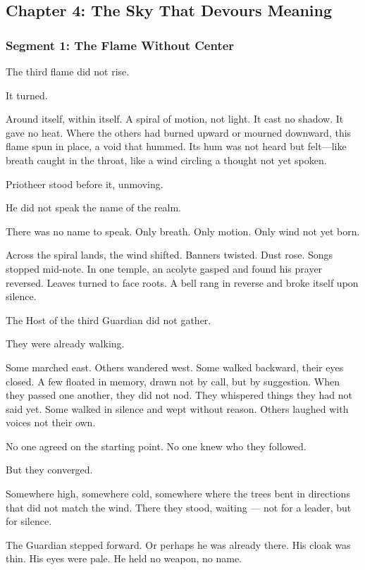\documentclass[9pt]{article}
\begin{document}
\newpage

\subsection*{Chapter 4: The Sky That Devours Meaning}

\vspace{1in}

\subsubsection*{Segment 1: The Flame Without Center}

The third flame did not rise.

It turned.

Around itself, within itself. A spiral of motion, not light. It cast no shadow. It gave no heat. Where the others had burned upward or mourned downward, this flame spun in place, a void that hummed. Its hum was not heard but felt—like breath caught in the throat, like a wind circling a thought not yet spoken.

Priotheer stood before it, unmoving.

He did not speak the name of the realm.

There was no name to speak. Only breath. Only motion. Only wind not yet born.

Across the spiral lands, the wind shifted. Banners twisted. Dust rose. Songs stopped mid-note. In one temple, an acolyte gasped and found his prayer reversed. Leaves turned to face roots. A bell rang in reverse and broke itself upon silence.

The Host of the third Guardian did not gather.

They were already walking.

Some marched east. Others wandered west. Some walked backward, their eyes closed. A few floated in memory, drawn not by call, but by suggestion. When they passed one another, they did not nod. They whispered things they had not said yet. Some walked in silence and wept without reason. Others laughed with voices not their own.

No one agreed on the starting point. No one knew who they followed.

But they converged.

Somewhere high, somewhere cold, somewhere where the trees bent in directions that did not match the wind. There they stood, waiting — not for a leader, but for silence.

The Guardian stepped forward. Or perhaps he was already there. His cloak was thin. His eyes were pale. He held no weapon, no name.
\end{document}
